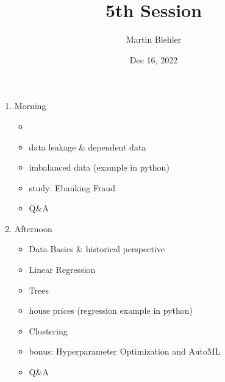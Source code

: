 \documentclass[letterpaper,10pt,english]{jupyterBook}
\title{5th Session}
\date{Dec 16, 2022}
\author{Martin Biehler}
\begin{document}
\pagestyle{empty}
\sphinxmaketitle
\pagestyle{plain}
\sphinxtableofcontents
\pagestyle{normal}
\label{\detokenize{intro::doc}}


\begin{sphinxVerbatim}[commandchars=\\\{\}]
                              
\end{sphinxVerbatim}
\begin{enumerate}
%
\item {} 
\sphinxAtStartPar
Morning
\begin{itemize}
\item {} 
\sphinxAtStartPar
{}

\item {} 
\sphinxAtStartPar
data leakage \& dependent data

\item {} 
\sphinxAtStartPar
imbalanced data (example in python)

\item {} 
\sphinxAtStartPar
study: Ebanking Fraud

\item {} 
\sphinxAtStartPar
Q\&A

\end{itemize}



\item {} 
\sphinxAtStartPar
Afternoon
\begin{itemize}
\item {} 
\sphinxAtStartPar
Data Basics \& historical perspective

\item {} 
\sphinxAtStartPar
Linear Regression

\item {} 
\sphinxAtStartPar
Trees

\item {} 
\sphinxAtStartPar
house prices (regression example in python)

\item {} 
\sphinxAtStartPar
Clustering

\item {} 
\sphinxAtStartPar
bonus: Hyperparameter Optimization and AutoML

\item {} 
\sphinxAtStartPar
Q\&A

\end{itemize}

\end{enumerate}
\end{document}
